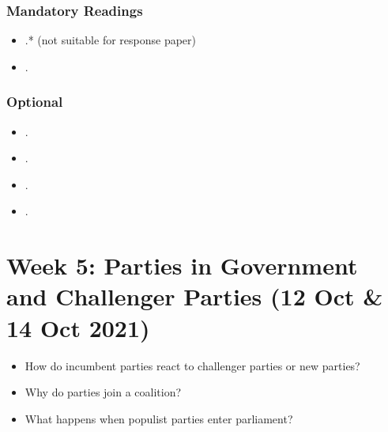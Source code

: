 \documentclass[abstract=on,parskip=full,headings=standardclasses,fontsize=11pt,paper=a4]{scrartcl}
\begin{document}
\subsubsection*{Mandatory Readings}



\begin{itemize}
\item {}.* (not suitable for response paper)
\item {}.
\end{itemize}



\subsubsection*{Optional}
\begin{itemize}
\item {}.
\item {}.
\item {}.
\item {}.
\end{itemize}







\section{Week 5: Parties in Government and Challenger Parties  (12 Oct \& 14 Oct 2021)}

\begin{itemize}
\renewcommand\labelitemi{--}
\item How do incumbent parties react to challenger parties or new parties?
\item Why do parties join a coalition? 
\item What happens when populist parties enter parliament?
\end{itemize}
\end{document}
